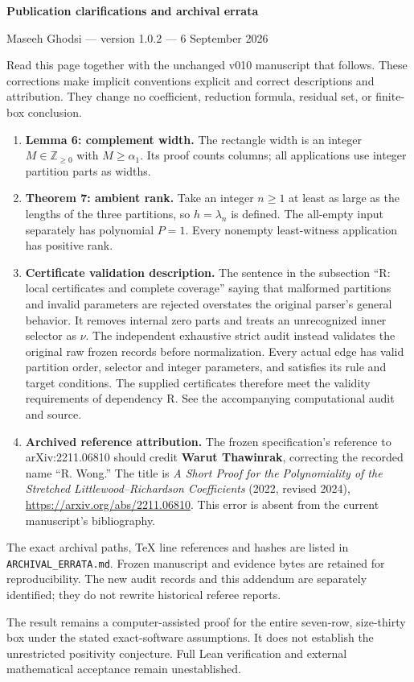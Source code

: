 \thispagestyle{empty}
\begin{center}
{\Large\bfseries Publication clarifications and archival errata\par}
\medskip
Maseeh Ghodsi --- version 1.0.2 --- 6 September 2026
\end{center}
\medskip
Read this page together with the unchanged v010 manuscript that follows.
These corrections make implicit conventions explicit and correct descriptions
and attribution. They change no coefficient, reduction formula, residual set,
or finite-box conclusion.
\begin{enumerate}
\item \textbf{Lemma 6: complement width.} The rectangle width is an integer
$M\in\mathbb Z_{\ge0}$ with $M\ge\alpha_1$. Its proof counts columns;
all applications use integer partition parts as widths.
\item \textbf{Theorem 7: ambient rank.} Take an integer $n\ge1$ at least as
large as the lengths of the three partitions, so $h=\lambda_n$ is defined.
The all-empty input separately has polynomial $P=1$. Every nonempty
least-witness application has positive rank.
\item \textbf{Certificate validation description.} The sentence in
the subsection ``R: local certificates and complete coverage'' saying that
malformed partitions and invalid parameters are
rejected overstates the original parser's general behavior. It removes
internal zero parts and treats an unrecognized inner selector as $\nu$.
The independent exhaustive strict audit instead validates the original raw
frozen records before normalization. Every actual edge has valid partition
order, selector and integer parameters, and satisfies its rule and target
conditions. The supplied certificates therefore meet the validity requirements
of dependency R. See the accompanying computational audit and source.
\item \textbf{Archived reference attribution.} The frozen specification's
reference to arXiv:2211.06810 should credit \textbf{Warut Thawinrak}, correcting
the recorded name ``R. Wong.'' The title is \emph{A Short Proof for the
Polynomiality of the Stretched Littlewood--Richardson Coefficients}
(2022, revised 2024), \url{https://arxiv.org/abs/2211.06810}.
This error is absent from the current manuscript's bibliography.
\end{enumerate}
The exact archival paths, TeX line references and hashes are listed in
\texttt{ARCHIVAL\_ERRATA.md}. Frozen manuscript and evidence bytes are retained
for reproducibility. The new audit records and this addendum are separately
identified; they do not rewrite historical referee reports.
\par\medskip
The result remains a computer-assisted proof for the entire seven-row,
size-thirty box under the stated exact-software assumptions. It does not
establish the unrestricted positivity conjecture. Full Lean verification
and external mathematical acceptance remain unestablished.
\clearpage
